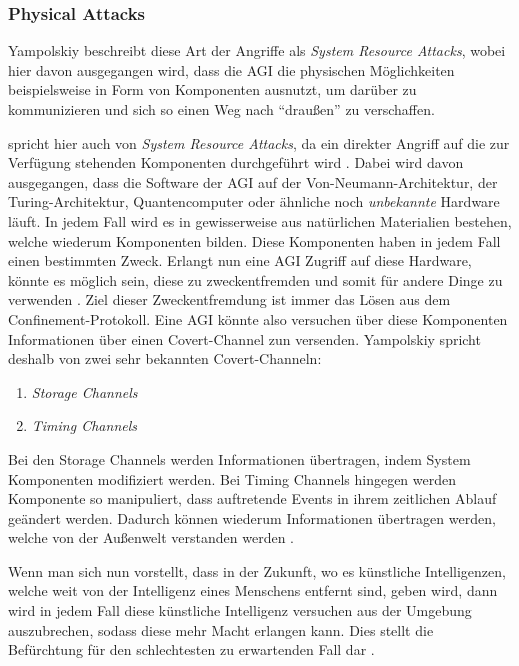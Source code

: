         \subsubsection{Physical Attacks}
        Yampolskiy beschreibt diese Art der Angriffe als \textit{System Resource Attacks}, wobei hier davon ausgegangen
        wird, dass die AGI die physischen Möglichkeiten beispielsweise in Form von Komponenten ausnutzt, um darüber zu
        kommunizieren und sich so einen Weg nach ``draußen'' zu verschaffen.\cite{yampolskiy2012leakproofing}

        \citeauthor*{yampolskiy2012leakproofing} spricht hier auch von \textit{System Resource Attacks}, da ein direkter
        Angriff auf die zur Verfügung stehenden Komponenten durchgeführt wird \citeyearpar{yampolskiy2012leakproofing}.
        Dabei wird davon ausgegangen, dass die Software der AGI auf der Von-Neumann-Architektur, der Turing-Architektur,
        Quantencomputer oder ähnliche noch \textit{unbekannte} Hardware läuft. In jedem Fall wird es in gewisserweise aus
        natürlichen Materialien bestehen, welche wiederum Komponenten bilden. Diese Komponenten haben in jedem Fall einen
        bestimmten Zweck. Erlangt nun eine AGI Zugriff auf diese Hardware, könnte es möglich sein, diese zu zweckentfremden
        und somit für andere Dinge zu verwenden \cite[s. 199]{yampolskiy2012leakproofing}. Ziel dieser Zweckentfremdung
        ist immer das Lösen aus dem Confinement-Protokoll. Eine AGI könnte also versuchen über diese Komponenten
        Informationen über einen Covert-Channel zun versenden. Yampolskiy spricht deshalb von zwei sehr bekannten
        Covert-Channeln:

        \begin{enumerate}
            \item \textit{Storage Channels}
            \item \textit{Timing Channels}
        \end{enumerate}

        Bei den Storage Channels werden Informationen übertragen, indem System Komponenten modifiziert werden. Bei Timing
        Channels hingegen werden Komponente so manipuliert, dass auftretende Events in ihrem zeitlichen Ablauf geändert
        werden. Dadurch können wiederum Informationen übertragen werden, welche von der Außenwelt verstanden werden
        \cite[s. 200]{yampolskiy2012leakproofing}.

        Wenn man sich nun vorstellt, dass in der Zukunft, wo es künstliche Intelligenzen, welche weit von
        der Intelligenz eines Menschens entfernt sind, geben wird, dann wird in jedem Fall diese künstliche Intelligenz
        versuchen aus der Umgebung auszubrechen, sodass diese mehr Macht erlangen kann. Dies stellt die Befürchtung für
        den schlechtesten zu erwartenden Fall dar \cite{yampolskiy2012leakproofing}.

